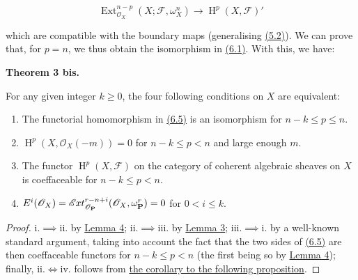 \documentclass{article}
\newenvironment{itenv}[1]
  {\phantomsection\par\smallskip\noindent\textbf{#1.}\itshape}
  {\par\smallskip}
\newenvironment{eqenv}
  {}
  {}
\theoremstyle{definition}
\theoremstyle{definition}
\theoremstyle{definition}
\theoremstyle{definition}
\theoremstyle{remark}
\begin{document}
\leavevmode{}%
\begin{eqenv}
\[
  \operatorname{Ext}_{{\mathscr{O}}_X}^{n-p}(X;{\mathscr{F}},\omega_X^n) \to \operatorname{H}^p(X,{\mathscr{F}})'
\tag{6.5}
\]

\end{eqenv}

which are compatible with the boundary maps (generalising \protect\hyperlink{fga-1-equation-5.2}{(5.2)}).
We can prove that, for \(p=n\), we thus obtain the isomorphism in \protect\hyperlink{fga-1-equation-6.1}{(6.1)}.
With this, we have:

\hypertarget{fga-1-theorem-3bis}{}
\begin{itenv}{Theorem 3 bis}

For any given integer \(k\geqslant 0\), the four following conditions on \(X\) are equivalent:

\begin{enumerate}
\def\labelenumi{\roman{enumi}.}
\item
  The functorial homomorphism in \protect\hyperlink{fga-1-equation-6.5}{(6.5)} is an isomorphism for \(n-k\leqslant p\leqslant n\).
\item
  \(\operatorname{H}^p(X,{\mathscr{O}}_X(-m)) = 0\) for \(n-k\leqslant p<n\) and large enough \(m\).
\item
  The functor \(\operatorname{H}^p(X,{\mathscr{F}})\) on the category of coherent algebraic sheaves on \(X\) is coeffaceable for \(n-k\leqslant p<n\).
\item
  \(E^i({\mathscr{O}}_X) = \mathscr{E}\kern -.5pt xt_{{\mathscr{O}}_\mathbf{P}}^{r-n+i}({\mathscr{O}}_X,\omega_\mathbf{P}^r) = 0\) for \(0<i\leqslant k\).
\end{enumerate}

\end{itenv}

\begin{proof}
i.\(\implies\)ii. by \protect\hyperlink{fga-1-lemma-4}{Lemma 4};
ii.\(\implies\)iii. by \protect\hyperlink{fga-1-lemma-3}{Lemma 3};
iii.\(\implies\)i. by a well-known standard argument, taking into account the fact that the two sides of \protect\hyperlink{fga-1-equation-6.5}{(6.5)} are then coeffaceable functors for \(n-k\leqslant p< n\) (the first being so by \protect\hyperlink{fga-1-lemma-4}{Lemma 4});
finally, ii.\(\iff\)iv. follows from \protect\hyperlink{fga-1-proposition-6-corollary}{the corollary to the following proposition}.
\end{proof}
\end{document}
